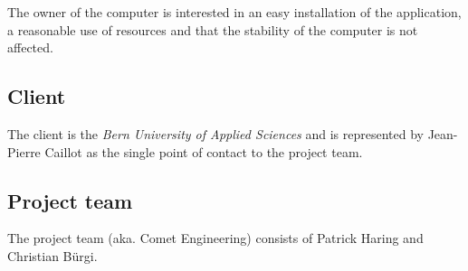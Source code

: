 \documentclass[fontsize=12pt,
               paper=a4,
               twoside=false,
               parskip=half,
               ]{scrartcl}
\begin{document}
The owner of the computer is interested in an easy installation of the application, a reasonable use of resources and that the stability of the computer is not affected.



\subsection{Client}

The client is the \emph{Bern University of Applied Sciences} and is represented by Jean-Pierre Caillot as the single point of contact to the project team.

\subsection{Project team}

The project team (aka. Comet Engineering) consists of Patrick Haring and Christian Bürgi.
\end{document}
